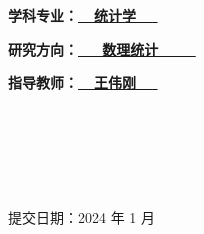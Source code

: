 \documentclass[a4paper,12pt,openany,oneside,utf-8]{ctexbook}
\newcommand{\sanhao}{\fontsize{15.75pt}{\baselineskip}\selectfont}
\begin{document}
\begin{titlepage}
\begin{center}
\textbf{\kaishu\sanhao 学科专业：\underline{\quad \quad \quad \ \ 统计学 \ \ \quad \quad \quad}}
\end{center}


\begin{center}
\textbf{\kaishu\sanhao 研究方向：\underline{\quad \quad \ \ \ 数理统计 \ \ \ \ \quad \quad}}
\end{center}

\begin{center}
\textbf{\kaishu\sanhao 指导教师：\underline{\quad \quad \quad \ \  王伟刚 \ \ \quad \quad \quad  }}
\end{center}

\

\

\


\begin{center}
\kaishu\sanhao 提交日期：2024 年 1 月
\end{center}
\end{titlepage}



% 


















\end{document}
